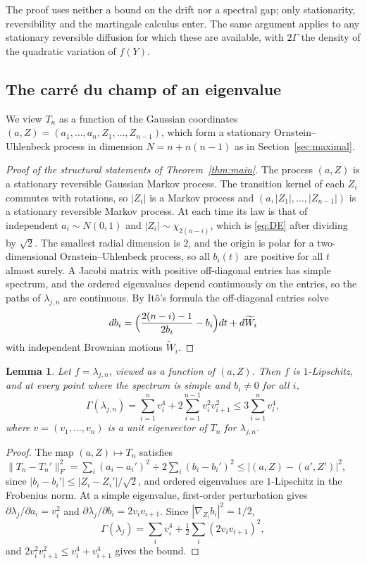 \documentclass[11pt]{amsart}
\newtheorem{lemma}[theorem]{Lemma}
\theoremstyle{remark}
\begin{document}
The proof uses neither a bound on the drift nor a spectral gap; only stationarity, reversibility and the martingale
calculus enter. The same argument applies to any stationary reversible diffusion for which these are available, with
$2\Gamma$ the density of the quadratic variation of $f(Y)$.

\subsection{The carr\'e du champ of an eigenvalue}\label{sec:noise}

We view $T_n$ as a function of the Gaussian coordinates $(a,Z)=(a_1,\dots,a_n,Z_1,\dots,Z_{n-1})$, which form a
stationary Ornstein--Uhlenbeck process in dimension $N=n+n(n-1)$ as in Section~\ref{sec:maximal}.

\begin{proof}[Proof of the structural statements of Theorem~\ref{thm:main}]
The process $(a,Z)$ is a stationary reversible Gaussian Markov process. The transition kernel of each $Z_i$ commutes
with rotations, so $|Z_i|$ is a Markov process and $(a,|Z_1|,\dots,|Z_{n-1}|)$ is a stationary reversible Markov
process. At each time its law is that of independent $a_i\sim N(0,1)$ and $|Z_i|\sim\chi_{2(n-i)}$, which is
\eqref{eq:DE} after dividing by $\sqrt2$. The smallest radial dimension is $2$, and the origin is polar for a
two-dimensional Ornstein--Uhlenbeck process, so all $b_i(t)$ are positive for all $t$ almost surely. A Jacobi matrix with
positive off-diagonal entries has simple spectrum, and the ordered eigenvalues depend continuously on the entries, so
the paths of $\lambda_{j,n}$ are continuous. By It\^o's formula the off-diagonal entries solve
\[
db_i=\Bigl(\frac{2(n-i)-1}{2b_i}-b_i\Bigr)dt+d\widetilde W_i
\]
with independent Brownian motions $\widetilde W_i$.
\end{proof}

\begin{lemma}\label{lem:noise}
Let $f=\lambda_{j,n}$, viewed as a function of $(a,Z)$. Then $f$ is $1$-Lipschitz, and at every point where the spectrum
is simple and $b_i\ne0$ for all $i$,
\[
\Gamma(\lambda_{j,n})=\sum_{i=1}^nv_i^4+2\sum_{i=1}^{n-1}v_i^2v_{i+1}^2\le3\sum_{i=1}^nv_i^4,
\]
where $v=(v_1,\dots,v_n)$ is a unit eigenvector of $T_n$ for $\lambda_{j,n}$.
\end{lemma}

\begin{proof}
The map $(a,Z)\mapsto T_n$ satisfies $\|T_n-T_n'\|_F^2=\sum_i(a_i-a_i')^2+2\sum_i(b_i-b_i')^2\le|(a,Z)-(a',Z')|^2$,
since $|b_i-b_i'|\le|Z_i-Z_i'|/\sqrt2$, and ordered eigenvalues are $1$-Lipschitz in the Frobenius norm. At a simple
eigenvalue, first-order perturbation gives $\partial\lambda_j/\partial a_i=v_i^2$ and
$\partial\lambda_j/\partial b_i=2v_iv_{i+1}$. Since $|\nabla_{Z_i}b_i|^2=1/2$,
\[
\Gamma(\lambda_j)=\sum_iv_i^4+\tfrac12\sum_i(2v_iv_{i+1})^2,
\]
and $2v_i^2v_{i+1}^2\le v_i^4+v_{i+1}^4$ gives the bound.
\end{proof}
\end{document}
